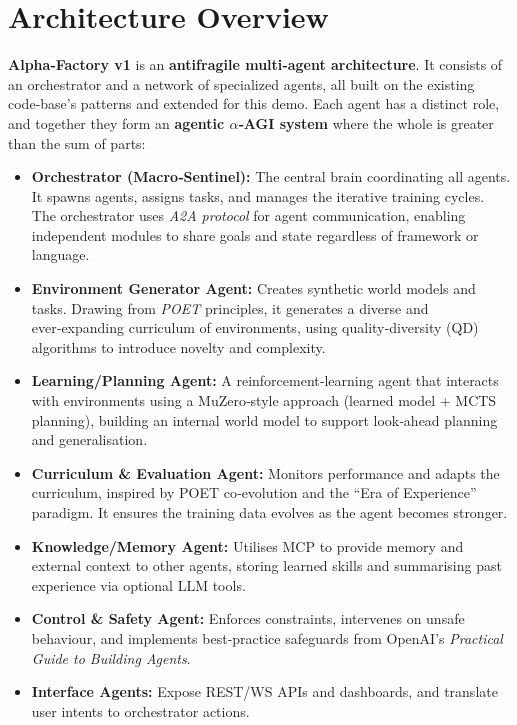 \documentclass{article}
\begin{document}
\section*{Architecture Overview}

\textbf{Alpha‑Factory v1} is an \textbf{antifragile multi‑agent architecture}. It consists of an orchestrator and a network of specialized agents, all built on the existing code‑base's patterns and extended for this demo. Each agent has a distinct role, and together they form an \textbf{agentic $\alpha$‑AGI system} where the whole is greater than the sum of parts:

\begin{itemize}[leftmargin=*]
  \item \textbf{Orchestrator (Macro‑Sentinel):} The central brain coordinating all agents. It spawns agents, assigns tasks, and manages the iterative training cycles. The orchestrator uses \textit{A2A protocol} for agent communication, enabling independent modules to share goals and state regardless of framework or language. 
  \item \textbf{Environment Generator Agent:} Creates synthetic world models and tasks. Drawing from \textit{POET} principles, it generates a diverse and ever‑expanding curriculum of environments, using quality‑diversity (QD) algorithms to introduce novelty and complexity.
  \item \textbf{Learning/Planning Agent:} A reinforcement‑learning agent that interacts with environments using a MuZero‑style approach (learned model + MCTS planning), building an internal world model to support look‑ahead planning and generalisation.
  \item \textbf{Curriculum \& Evaluation Agent:} Monitors performance and adapts the curriculum, inspired by POET co‑evolution and the ``Era of Experience'' paradigm. It ensures the training data evolves as the agent becomes stronger.
  \item \textbf{Knowledge/Memory Agent:} Utilises MCP to provide memory and external context to other agents, storing learned skills and summarising past experience via optional LLM tools.
  \item \textbf{Control \& Safety Agent:} Enforces constraints, intervenes on unsafe behaviour, and implements best‑practice safeguards from OpenAI's \textit{Practical Guide to Building Agents}.
  \item \textbf{Interface Agents:} Expose REST/WS APIs and dashboards, and translate user intents to orchestrator actions.
\end{itemize}
\end{document}
